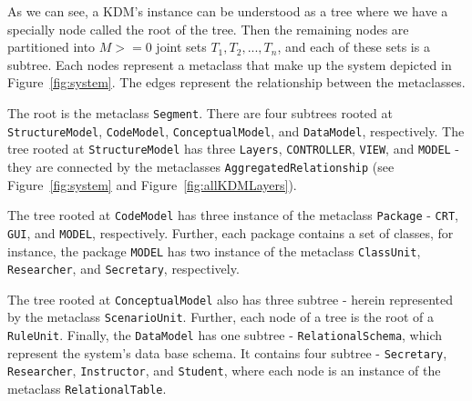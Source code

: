 As we can see, a KDM's instance can be understood as a tree where we have a specially node called the root of the tree. Then the remaining nodes are partitioned into $\textit{M} >= 0$ joint sets $T_{1}, T_{2}, ..., T_{n}$, and each of these sets is a subtree.  Each nodes represent a metaclass that make up the system depicted in Figure~\ref{fig:system}. The edges represent the relationship between the metaclasses.


%
The root is the metaclass \texttt{Segment}. There are four subtrees rooted at \texttt{StructureModel}, \texttt{CodeModel}, \texttt{ConceptualModel}, and \texttt{DataModel}, respectively. 
The tree rooted at \texttt{StructureModel} has three \texttt{Layers}, \texttt{CONTROLLER}, \texttt{VIEW}, and \texttt{MODEL} - they are connected by the metaclasses \texttt{AggregatedRelationship} (see Figure~\ref{fig:system} and Figure~\ref{fig:allKDMLayers}).

The tree rooted at \texttt{CodeModel} has three instance of the metaclass \texttt{Package} - \texttt{CRT}, \texttt{GUI}, and \texttt{MODEL}, respectively. Further, each package contains a set of classes, for instance, the package \texttt{MODEL} has two instance of the metaclass \texttt{ClassUnit}, \texttt{Researcher}, and \texttt{Secretary}, respectively.

The tree rooted at \texttt{ConceptualModel} also has three subtree - herein represented by the metaclass \texttt{ScenarioUnit}. Further, each node of a tree is the root of a \texttt{RuleUnit}. Finally, the \texttt{DataModel} has one subtree - \texttt{RelationalSchema}, which represent the system's data base schema. It contains four subtree - \texttt{Secretary}, \texttt{Researcher}, \texttt{Instructor}, and \texttt{Student}, where each node is an instance of the metaclass \texttt{RelationalTable}. 





